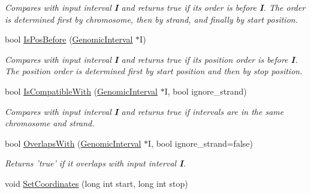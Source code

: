 \begin{DoxyCompactItemize}
\begin{DoxyCompactList}\small\item\em Compares with input interval {\bfseries I} and returns true if its order is before {\bfseries I}. The order is determined first by chromosome, then by strand, and finally by start position. \end{DoxyCompactList}\item 
\hypertarget{classGenomicInterval_a8fc5d344a103f145db968e536b30f9cf}{
bool \hyperlink{classGenomicInterval_a8fc5d344a103f145db968e536b30f9cf}{IsPosBefore} (\hyperlink{classGenomicInterval}{GenomicInterval} $\ast$I)}
\label{classGenomicInterval_a8fc5d344a103f145db968e536b30f9cf}

\begin{DoxyCompactList}\small\item\em Compares with input interval {\bfseries I} and returns true if its position order is before {\bfseries I}. The position order is determined first by start position and then by stop position. \end{DoxyCompactList}\item 
\hypertarget{classGenomicInterval_ab6febc4c04d4919a9485ce8eeec5129d}{
bool \hyperlink{classGenomicInterval_ab6febc4c04d4919a9485ce8eeec5129d}{IsCompatibleWith} (\hyperlink{classGenomicInterval}{GenomicInterval} $\ast$I, bool ignore\_\-strand)}
\label{classGenomicInterval_ab6febc4c04d4919a9485ce8eeec5129d}

\begin{DoxyCompactList}\small\item\em Compares with input interval {\bfseries I} and returns true if intervals are in the same chromosome and strand. \end{DoxyCompactList}\item 
\hypertarget{classGenomicInterval_aa1c591b6d3cc3c576cec24a3ab67abfb}{
bool \hyperlink{classGenomicInterval_aa1c591b6d3cc3c576cec24a3ab67abfb}{OverlapsWith} (\hyperlink{classGenomicInterval}{GenomicInterval} $\ast$I, bool ignore\_\-strand=false)}
\label{classGenomicInterval_aa1c591b6d3cc3c576cec24a3ab67abfb}

\begin{DoxyCompactList}\small\item\em Returns 'true' if it overlaps with input interval {\bfseries I}. \end{DoxyCompactList}\item 
\hypertarget{classGenomicInterval_ac76f5c0d3cae831f6cec9d8a27b1c56d}{
void \hyperlink{classGenomicInterval_ac76f5c0d3cae831f6cec9d8a27b1c56d}{SetCoordinates} (long int start, long int stop)}
\label{classGenomicInterval_ac76f5c0d3cae831f6cec9d8a27b1c56d}


\end{DoxyCompactItemize}
